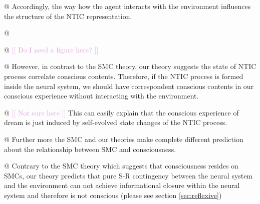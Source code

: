 \documentclass[utf8]{article}
\newenvironment{ants}
			{
			 \begin{easylist}[itemize]		
		 	}
			{
			\end{easylist}
			}
\newcommand{\idea}[2][Plum]{\noindent
				\textcolor{#1}{[[ #2 ]]}}
\begin{document}
\begin{ants}
				@ Accordingly, the way how the agent interacts with the environment influences the structure of the NTIC representation. 
				
				
				
				@ 
				
				@ \idea{Do I need a figure here?}				
				
				@ However, in contrast to the SMC theory, our theory suggests the state of NTIC process correlate conscious contents. Therefore, if the NTIC process is formed inside the neural system, we should have correspondent conscious contents in our conscious experience without interacting with the environment. 
				
				@ \idea{Not sure here} This can easily explain that the conscious experience of dream is just induced by self-evolved state changes of the NTIC process. 
				
				
				@ Further more the SMC and our theories make complete different prediction about the relationship between SMC and consciousness.
				
				@ Contrary to the SMC theory which suggests that consciousness resides on SMCs, our theory predicts that pure S-R contingency between the neural system and the environment can not achieve informational closure within the neural system and therefore is not conscious (please see section \ref{sec:reflexive})
				
			\end{ants}
\end{document}
